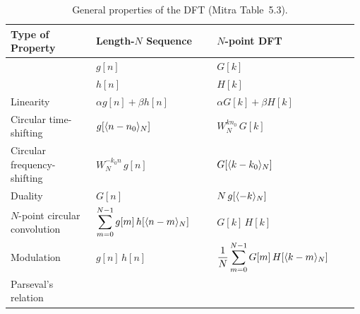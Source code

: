 \begin{table}[H]
\centering
\caption{General properties of the DFT (Mitra Table~5.3).}
\label{tab:dft-theorems}

\small
\begin{tabular}{@{}>{\raggedright\arraybackslash}p{0.24\linewidth}@{}>{\raggedright\arraybackslash}p{0.34\linewidth}@{}>{\raggedright\arraybackslash}p{0.40\linewidth}@{}}
\toprule
\textbf{Type of Property} & \textbf{Length-$N$ Sequence} & \textbf{$N$-point DFT} \\
\midrule
& $g[n]$ & $G[k]$ \\
& $h[n]$ & $H[k]$ \\
\midrule
Linearity &
$\alpha g[n]+\beta h[n]$ &
$\alpha G[k]+\beta H[k]$ \\[0.6em]
Circular time-shifting &
$g[\langle n-n_0\rangle_{N}]$ &
$W_N^{kn_0}\,G[k]$ \\[0.6em]
Circular frequency-shifting &
$W_N^{-k_0 n}\,g[n]$ &
$G[\langle k-k_0\rangle_{N}]$ \\[0.6em]
Duality &
$G[n]$ &
$N\,g[\langle -k\rangle_{N}]$ \\[0.6em]
$N$-point circular convolution &
$\displaystyle\sum_{m=0}^{N-1} g[m]\,h[\langle n-m\rangle_{N}]$ &
$G[k]\,H[k]$ \\[1.2em]
Modulation &
$g[n]\,h[n]$ &
$\displaystyle\frac{1}{N}\sum_{m=0}^{N-1} G[m]\,H[\langle k-m\rangle_{N}]$ \\[1.2em]
Parseval's relation &
\multicolumn{2}{l}{$\displaystyle\sum_{n=0}^{N-1} |x[n]|^2=\frac{1}{N}\sum_{k=0}^{N-1} |X[k]|^2$} \\
\bottomrule
\end{tabular}
\end{table}
